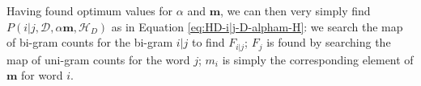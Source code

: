 %
Having found optimum values for $\alpha$ and $\boldsymbol{m}$, we can then very simply find $P(i|j,\mathcal{D},\alpha\boldsymbol{m},\mathscr{H}_{D})$ as in Equation \ref{eq:HD-i|j-D-alpham-H}: we search the map of bi-gram counts for the bi-gram $i|j$ to find $F_{i|j}$; $F_{j}$ is found by searching the map of uni-gram counts for the word $j$; $m_{i}$ is simply the corresponding element of $\boldsymbol{m}$ for word $i$.

